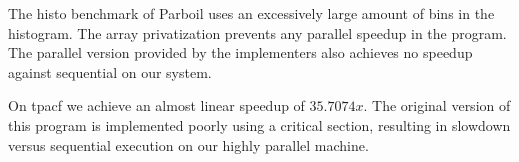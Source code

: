 The histo benchmark of Parboil uses an excessively large amount of bins in the histogram.
The array privatization prevents any parallel speedup in the program.
The parallel version provided by the implementers also achieves no speedup against sequential on our system.


On tpacf we achieve an almost linear speedup of $35.7074x$.
The original version of this program is implemented poorly using a critical section, resulting in slowdown versus sequential execution on our highly parallel machine.%


